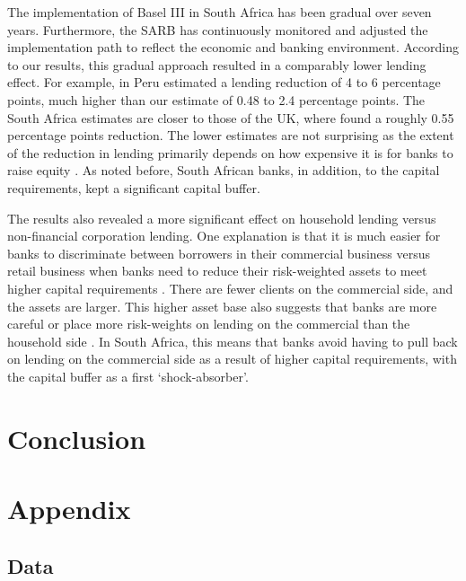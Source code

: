\documentclass[
  12,
]{article}
\begin{document}
The implementation of Basel III in South Africa has been gradual over seven years. Furthermore, the SARB has continuously monitored and adjusted the implementation path to reflect the economic and banking environment. According to our results, this gradual approach resulted in a comparably lower lending effect. For example, in Peru \citet{fang2020bank} estimated a lending reduction of 4 to 6 percentage points, much higher than our estimate of 0.48 to 2.4 percentage points. The South Africa estimates are closer to those of the UK, where \citet{aiyar2016does} found a roughly 0.55 percentage points reduction. The lower estimates are not surprising as the extent of the reduction in lending primarily depends on how expensive it is for banks to raise equity \citep{aiyar2016does}. As noted before, South African banks, in addition, to the capital requirements, kept a significant capital buffer.

The results also revealed a more significant effect on household lending versus non-financial corporation lending. One explanation is that it is much easier for banks to discriminate between borrowers in their commercial business versus retail business when banks need to reduce their risk-weighted assets to meet higher capital requirements \citep{de2020bank}. There are fewer clients on the commercial side, and the assets are larger. This higher asset base also suggests that banks are more careful or place more risk-weights on lending on the commercial than the household side \citep{imbierowicz2018time}. In South Africa, this means that banks avoid having to pull back on lending on the commercial side as a result of higher capital requirements, with the capital buffer as a first `shock-absorber'.

\newpage

\hypertarget{conclusion}{%
\section{Conclusion}\label{conclusion}}

\newpage

\newpage

\hypertarget{appendix}{%
\section{Appendix}\label{appendix}}

\hypertarget{data-1}{%
\subsection{Data}\label{data-1}}
\end{document}
